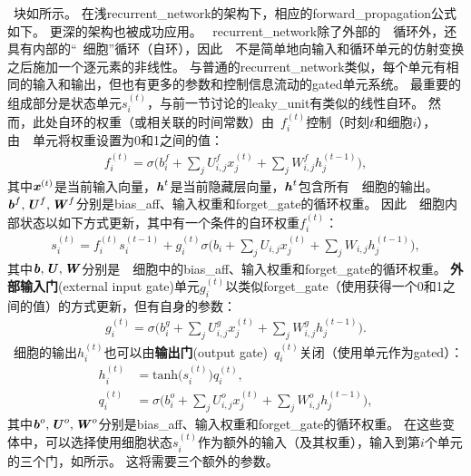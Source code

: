~块如所示。
在浅\gls{recurrent_network}的架构下，相应的\gls{forward_propagation}公式如下。
更深的架构也被成功应用\citep{Graves-et-al-ICASSP2013,Pascanu-et-al-ICLR2014}。
~\gls{recurrent_network}除了外部的~~循环外，还具有内部的``~细胞''循环（自环），因此~~不是简单地向输入和循环单元的仿射变换之后施加一个逐元素的非线性。
与普通的\gls{recurrent_network}类似，每个单元有相同的输入和输出，但也有更多的参数和控制信息流动的\gls{gated}单元系统。
最重要的组成部分是状态单元$s_i^{(t)}$，与前一节讨论的\gls{leaky_unit}有类似的线性自环。
然而，此处自环的权重（或相关联的时间常数）由~$f_i^{(t)}$控制（时刻$t$和细胞$i$），由~~单元将权重设置为0和1之间的值：
\begin{align}
 f_i^{(t)} = \sigma \Big( b_i^f + \sum_j U_{i,j}^f x_j^{(t)} + \sum_j W_{i,j}^f h_j^{(t-1)} \Big),
\end{align}
其中$\boldsymbol{\mathit{x}}^{(t)}$是当前输入向量，$\boldsymbol{\mathit{h}}^{t}$是当前隐藏层向量，$\boldsymbol{\mathit{h}}^{t}$包含所有~~细胞的输出。 
$\boldsymbol{\mathit{b}}^f, \boldsymbol{\mathit{U}}^f, \boldsymbol{\mathit{W}}^f$分别是\gls{bias_aff}、输入权重和\gls{forget_gate}的循环权重。
因此~~细胞内部状态以如下方式更新，其中有一个条件的自环权重$f_i^{(t)}$：
\begin{align}
 s_i^{(t)} = f_i^{(t)}  s_i^{(t-1)} +  g_i^{(t)}
 \sigma \Big( b_i + \sum_j U_{i,j} x_j^{(t)} + \sum_j W_{i,j} h_j^{(t-1)} \Big),
\end{align}
其中$\boldsymbol{\mathit{b}}, \boldsymbol{\mathit{U}}, \boldsymbol{\mathit{W}}$分别是~~细胞中的\gls{bias_aff}、输入权重和\gls{forget_gate}的循环权重。
\textbf{外部输入门}(external input gate)单元$g_i^{(t)}$以类似\gls{forget_gate}（使用获得一个0和1之间的值）的方式更新，但有自身的参数：
\begin{align}
 g_i^{(t)} = \sigma \Big( b_i^g + \sum_j U_{i,j}^g x_j^{(t)} + \sum_j W_{i,j}^g h_j^{(t-1)} \Big).
\end{align}
~细胞的输出$h_i^{(t)}$也可以由\textbf{输出门}(output gate)~$q_i^{(t)}$关闭（使用单元作为\gls{gated}）：
\begin{align}
 h_i^{(t)} &= \text{tanh}\big( s_i^{(t)} \big) q_i^{(t)}, \\
 q_i^{(t)} &= \sigma \Big( b_i^o + \sum_j U_{i,j}^o x_j^{(t)} + \sum_j W_{i,j}^o h_j^{(t-1)} \Big),
\end{align}
其中$\boldsymbol{\mathit{b}}^o, \boldsymbol{\mathit{U}}^o, \boldsymbol{\mathit{W}}^o$分别是\gls{bias_aff}、输入权重和\gls{forget_gate}的循环权重。
在这些变体中，可以选择使用细胞状态$s_i^{(t)}$作为额外的输入（及其权重），输入到第$i$个单元的三个门，如所示。
这将需要三个额外的参数。

